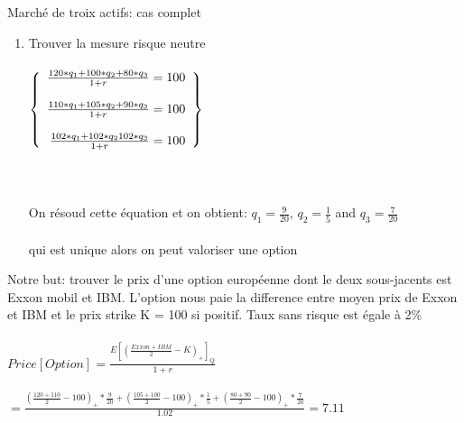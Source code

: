 \documentclass[10pt]{beamer}
\begin{document}
\begin{frame}{Marché de troix actifs: cas complet}{}
\scriptsize{
    \begin{enumerate}
      \item Trouver la mesure risque neutre \\~\\
      \begin{math}
       
        \left\{
        \begin{array}{r c l}

            \frac{120*q_{1} + 100*q_{2} + 80*q_{3}}{1+r} = 100 \\~\\ 
            
            \frac{110*q_{1} + 105*q_{2} + 90*q_{3}}{1+r} = 100 \\~\\ 

            \frac{102*q_{1} + 102*q_{2} 102*q_{3}}{1+r} = 100 \\ 
       \end{array}
       \right\}
      \end{math} \\~\\ \\~\\
  
    On résoud cette équation et on obtient: $q_{1} = \frac{9}{20}$, $q_{2} =\frac{1}{5}$ and $q_{3} = \frac{7}{20}$ \\~\\
   qui est unique alors on peut valoriser une option
    \end{enumerate}
    
    

 }
 
 Notre but: trouver le prix d'une option européenne dont le deux sous-jacents est Exxon mobil et IBM. L'option nous paie la difference entre moyen prix de Exxon et IBM et le prix strike K = 100 si positif. Taux sans risque est égale à 2\% \\~\\
  
  $Price[Option] = \frac{E[(\frac{Exxon+IBM}{2} - K)_{+}]_{Q}}{1+r}$ \\~\\ $ = \frac{(\frac{120+110}{2}-100)_{+}*\frac{9}{20}+(\frac{105+100}{2}-100)_{+}*\frac{1}{5}+(\frac{80+90}{2}-100)_{+}*\frac{7}{20}}{1.02} = 7.11$
  
\end{frame}
\end{document}
